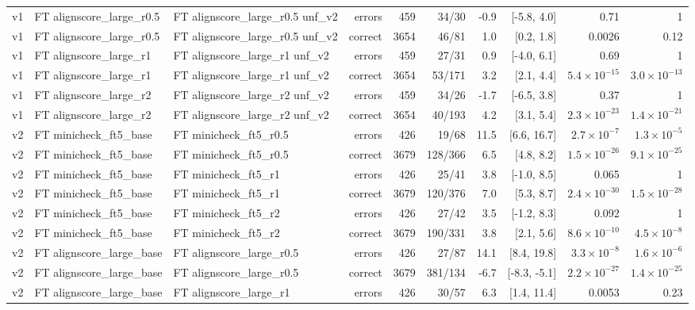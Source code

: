 \begin{scriptsize}
\begin{longtable}{lllrrrrrrr}
v1 & FT alignscore\_large\_r0.5 & FT alignscore\_large\_r0.5 unf\_v2 & errors & 459 & 34/30 & -0.9 & [-5.8, 4.0] & 0.71 & 1 \\
v1 & FT alignscore\_large\_r0.5 & FT alignscore\_large\_r0.5 unf\_v2 & correct & 3654 & 46/81 & 1.0 & [0.2, 1.8] & 0.0026 & 0.12 \\
v1 & FT alignscore\_large\_r1 & FT alignscore\_large\_r1 unf\_v2 & errors & 459 & 27/31 & 0.9 & [-4.0, 6.1] & 0.69 & 1 \\
v1 & FT alignscore\_large\_r1 & FT alignscore\_large\_r1 unf\_v2 & correct & 3654 & 53/171 & 3.2 & [2.1, 4.4] & $5.4\times10^{-15}$ & $3.0\times10^{-13}$ \\
v1 & FT alignscore\_large\_r2 & FT alignscore\_large\_r2 unf\_v2 & errors & 459 & 34/26 & -1.7 & [-6.5, 3.8] & 0.37 & 1 \\
v1 & FT alignscore\_large\_r2 & FT alignscore\_large\_r2 unf\_v2 & correct & 3654 & 40/193 & 4.2 & [3.1, 5.4] & $2.3\times10^{-23}$ & $1.4\times10^{-21}$ \\
\midrule
v2 & FT minicheck\_ft5\_base & FT minicheck\_ft5\_r0.5 & errors & 426 & 19/68 & 11.5 & [6.6, 16.7] & $2.7\times10^{-7}$ & $1.3\times10^{-5}$ \\
v2 & FT minicheck\_ft5\_base & FT minicheck\_ft5\_r0.5 & correct & 3679 & 128/366 & 6.5 & [4.8, 8.2] & $1.5\times10^{-26}$ & $9.1\times10^{-25}$ \\
v2 & FT minicheck\_ft5\_base & FT minicheck\_ft5\_r1 & errors & 426 & 25/41 & 3.8 & [-1.0, 8.5] & 0.065 & 1 \\
v2 & FT minicheck\_ft5\_base & FT minicheck\_ft5\_r1 & correct & 3679 & 120/376 & 7.0 & [5.3, 8.7] & $2.4\times10^{-30}$ & $1.5\times10^{-28}$ \\
v2 & FT minicheck\_ft5\_base & FT minicheck\_ft5\_r2 & errors & 426 & 27/42 & 3.5 & [-1.2, 8.3] & 0.092 & 1 \\
v2 & FT minicheck\_ft5\_base & FT minicheck\_ft5\_r2 & correct & 3679 & 190/331 & 3.8 & [2.1, 5.6] & $8.6\times10^{-10}$ & $4.5\times10^{-8}$ \\
v2 & FT alignscore\_large\_base & FT alignscore\_large\_r0.5 & errors & 426 & 27/87 & 14.1 & [8.4, 19.8] & $3.3\times10^{-8}$ & $1.6\times10^{-6}$ \\
v2 & FT alignscore\_large\_base & FT alignscore\_large\_r0.5 & correct & 3679 & 381/134 & -6.7 & [-8.3, -5.1] & $2.2\times10^{-27}$ & $1.4\times10^{-25}$ \\
v2 & FT alignscore\_large\_base & FT alignscore\_large\_r1 & errors & 426 & 30/57 & 6.3 & [1.4, 11.4] & 0.0053 & 0.23 \\

\end{longtable}
\end{scriptsize}
